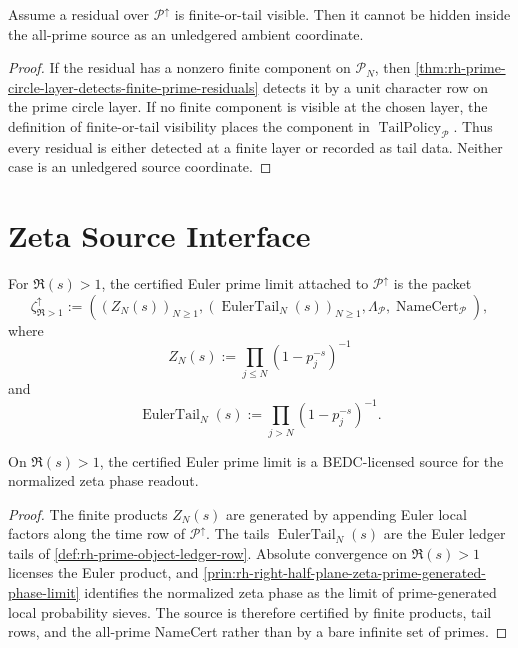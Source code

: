 \begin{theorem}
\label{thm:rh-all-prime-object-no-unledgered-residual-escape}
Assume a residual over $\mathcal P^\uparrow$ is finite-or-tail visible.
Then it cannot be hidden inside the all-prime source as an unledgered
ambient coordinate.
\end{theorem}

\begin{proof}
If the residual has a nonzero finite component on $\mathcal P_N$, then
\autoref{thm:rh-prime-circle-layer-detects-finite-prime-residuals}
detects it by a unit character row on the prime circle layer.  If no
finite component is visible at the chosen layer, the definition of
finite-or-tail visibility places the component in
$\operatorname{TailPolicy}_{\mathcal P}$.  Thus every residual is either
detected at a finite layer or recorded as tail data.  Neither case is an
unledgered source coordinate.
\end{proof}

\section{Zeta Source Interface}
\label{sec:rh-all-prime-object-zeta-source-interface}

\begin{definition}
\label{def:rh-certified-euler-prime-limit}
For $\Re(s)>1$, the certified Euler prime limit attached to
$\mathcal P^\uparrow$ is the packet
$$
\zeta_{\Re>1}^{\uparrow}
:=
\left(
(Z_N(s))_{N\ge1},
(\operatorname{EulerTail}_N(s))_{N\ge1},
\Lambda_{\mathcal P},
\operatorname{NameCert}_{\mathcal P}
\right),
$$
where
$$
Z_N(s):=\prod_{j\le N}(1-p_j^{-s})^{-1}
$$
and
$$
\operatorname{EulerTail}_N(s)
:=
\prod_{j>N}(1-p_j^{-s})^{-1}.
$$
\end{definition}

\begin{theorem}
\label{thm:rh-all-prime-object-supplies-right-half-plane-zeta-source}
On $\Re(s)>1$, the certified Euler prime limit is a BEDC-licensed
source for the normalized zeta phase readout.
\end{theorem}

\begin{proof}
The finite products $Z_N(s)$ are generated by appending Euler local
factors along the time row of $\mathcal P^\uparrow$.  The tails
$\operatorname{EulerTail}_N(s)$ are the Euler ledger tails of
\autoref{def:rh-prime-object-ledger-row}.  Absolute convergence on
$\Re(s)>1$ licenses the Euler product, and
\autoref{prin:rh-right-half-plane-zeta-prime-generated-phase-limit}
identifies the normalized zeta phase as the limit of prime-generated
local probability sieves.  The source is therefore certified by
finite products, tail rows, and the all-prime NameCert rather than by a
bare infinite set of primes.
\end{proof}

